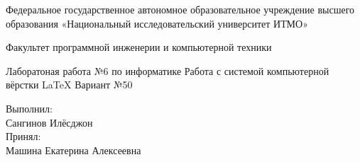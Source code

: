 \documentclass{memoir}
\begin{document}
\begin{center}
\begin{huge}

Федеральное государственное автономное образовательное учреждение\linebreak
высшего образования «Национальный исследовательский университет\linebreak
ИТМО»\linebreak


Факультет программной инженерии и компьютерной техники

\begin{vplace}
Лаборатоная работа №6\linebreak
по информатике\linebreak
Работа с системой компьютерной вёрстки \LaTeX\linebreak
Вариант №50\linebreak
\end{vplace}

\begin{raggedleft}

Выполнил:\\
Сангинов Илёсджон\\
Принял:\\
Машина Екатерина Алексеевна\\

\end{raggedleft}

\end{huge}
\end{center}
\end{document}

